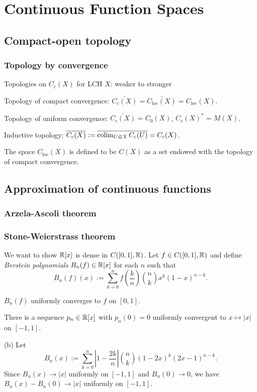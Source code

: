 \documentclass{../../large}
\begin{document}
\part{Continuous Function Spaces}
\chapter{Compact-open topology}

\section{Topology by convergence}

Topologies on $C_c(X)$ for LCH $X$: weaker to stronger
\begin{parts}
\item Topology of compact convergence: $\bar{C_c(X)}=\bar{C_{\mathrm{loc}}(X)}=C_{\mathrm{loc}}(X)$.
\item Topology of uniform convergence: $\bar{C_c(X)}=C_0(X)$, $C_c(X)^*=M(X)$.
\item Inductive topology: $\overline{C_c(X)}:=\overline{\operatorname*{colim}_{U\Subset X}C_c(U)}=C_c(X)$.
\end{parts}
The space $C_{\mathrm{loc}}(X)$ is defined to be $C(X)$ as a set endowed with the topology of compact convergence.





\chapter{Approximation of continuous functions}
\section{Arzela-Ascoli theorem}

\section{Stone-Weierstrass theorem}

\begin{prb}
We want to show $\mathbb{R}[x]$ is dense in $C([0,1],\mathbb{R})$.
Let $f\in C([0,1],\mathbb{R})$ and define \emph{Berstein polynomials} $B_n(f)\in\mathbb{R}[x]$ for each $n$ such that
\[B_n(f)(x):=\sum_{k=0}^nf\left(\frac kn\right)\binom nkx^k(1-x)^{n-k}.\]
\begin{parts}
\item $B_n(f)$ uniformly converges to $f$ on $[0,1]$.
\item There is a sequence $p_n\in\mathbb{R}[x]$ with $p_n(0)=0$ uniformly convergent to $x\mapsto|x|$ on $[-1,1]$.
\end{parts}
\end{prb}
\begin{pf}
(b)
Let
\[B_n(x):=\sum_{k=0}^n\left|1-\frac{2k}n\right|\binom nk(1-2x)^k(2x-1)^{n-k}.\]
Since $B_n(x)\to|x|$ uniformly on $[-1,1]$ and $B_n(0)\to0$, we have $B_n(x)-B_n(0)\to|x|$ uniformly on $[-1,1]$.
\end{pf}
\end{document}

